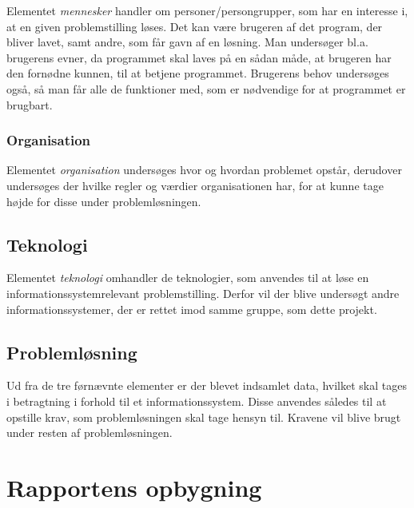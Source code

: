 Elementet \textit{mennesker} handler om personer/persongrupper, som har en interesse i, at en given problemstilling løses. 
Det kan være brugeren af det program, der bliver lavet, samt andre, som får gavn af en løsning.
Man undersøger bl.a. brugerens evner, da programmet skal laves på en sådan måde, at brugeren har den fornødne kunnen, til at betjene programmet.
Brugerens behov undersøges også, så man får alle de funktioner med, som er nødvendige for at programmet er brugbart.


\subsubsection{Organisation}\label{subsec:organisation}

Elementet \textit{organisation} undersøges hvor og hvordan problemet opstår, derudover undersøges der  hvilke regler og værdier organisationen har, for at kunne tage højde for disse under problemløsningen.  


\subsection{Teknologi}\label{subsec:Teknologi}

Elementet \textit{teknologi} omhandler de teknologier, som anvendes til at løse en informationssystemrelevant problemstilling.
Derfor vil der blive undersøgt andre informationssystemer, der er rettet imod samme gruppe, som dette projekt.


\subsection{Problemløsning}
Ud fra de tre førnævnte elementer er der blevet indsamlet data, hvilket skal tages i betragtning i forhold til et informationssystem.
Disse anvendes således til at opstille krav, som problemløsningen skal tage hensyn til. 
Kravene vil blive brugt under resten af problemløsningen.


\section{Rapportens opbygning}\label{sec:rapportens-opbygning}

